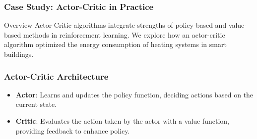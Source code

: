 \documentclass[aspectratio=169]{beamer}
\begin{document}
\begin{frame}[fragile]
    \frametitle{Case Study: Actor-Critic in Practice}
    \begin{block}{Overview}
        Actor-Critic algorithms integrate strengths of policy-based and value-based methods in reinforcement learning.
        We explore how an actor-critic algorithm optimized the energy consumption of heating systems in smart buildings.
    \end{block}
\end{frame}

\begin{frame}[fragile]
    \frametitle{Actor-Critic Architecture}
    \begin{itemize}
        \item \textbf{Actor}: Learns and updates the policy function, deciding actions based on the current state.
        \item \textbf{Critic}: Evaluates the action taken by the actor with a value function, providing feedback to enhance policy.
    \end{itemize}
\end{frame}
\end{document}
